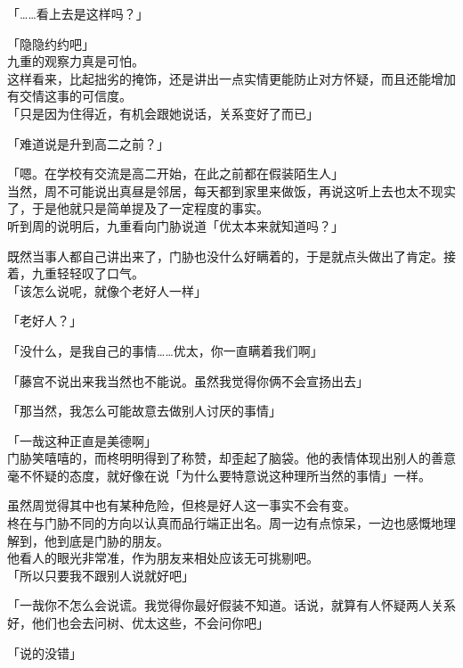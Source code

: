 「……看上去是这样吗？」

「隐隐约约吧」\\

九重的观察力真是可怕。\\

这样看来，比起拙劣的掩饰，还是讲出一点实情更能防止对方怀疑，而且还能增加有交情这事的可信度。\\

「只是因为住得近，有机会跟她说话，关系变好了而已」

「难道说是升到高二之前？」

「嗯。在学校有交流是高二开始，在此之前都在假装陌生人」\\

当然，周不可能说出真昼是邻居，每天都到家里来做饭，再说这听上去也太不现实了，于是他就只是简单提及了一定程度的事实。\\

听到周的说明后，九重看向门胁说道「优太本来就知道吗？」

既然当事人都自己讲出来了，门胁也没什么好瞒着的，于是就点头做出了肯定。接着，九重轻轻叹了口气。\\

「该怎么说呢，就像个老好人一样」

「老好人？」

「没什么，是我自己的事情……优太，你一直瞒着我们啊」

「藤宫不说出来我当然也不能说。虽然我觉得你俩不会宣扬出去」

「那当然，我怎么可能故意去做别人讨厌的事情」

「一哉这种正直是美德啊」\\

门胁笑嘻嘻的，而柊明明得到了称赞，却歪起了脑袋。他的表情体现出别人的善意毫不怀疑的态度，就好像在说「为什么要特意说这种理所当然的事情」一样。

虽然周觉得其中也有某种危险，但柊是好人这一事实不会有变。\\

柊在与门胁不同的方向以认真而品行端正出名。周一边有点惊呆，一边也感慨地理解到，他到底是门胁的朋友。\\

他看人的眼光非常准，作为朋友来相处应该无可挑剔吧。\\

「所以只要我不跟别人说就好吧」

「一哉你不怎么会说谎。我觉得你最好假装不知道。话说，就算有人怀疑两人关系好，他们也会去问树、优太这些，不会问你吧」

「说的没错」\\

